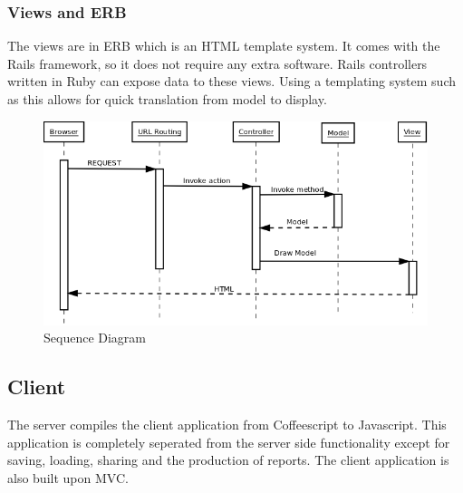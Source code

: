 \documentclass{report}
\begin{document}
				\subsubsection{Views and ERB} 
					The views are in ERB \cite{erb} which is an HTML template system. It comes with the Rails framework, so it does not require any extra software. Rails controllers written in Ruby can expose data to these views. Using a templating system such as this allows for quick translation from model to display. 
			\clearpage
			\begin{figure}[htb]
				\begin{center}
				\includegraphics[width=\linewidth]{SequenceDiagramLife.png}
				\caption{Sequence Diagram}
				\label{fig: SequenceDiagram}
				\end{center}
				\end{figure}	
			\clearpage

			\subsection{Client}
				The server compiles the client application from Coffeescript to Javascript. This application is completely seperated from the server side functionality except for saving, loading, sharing and the production of reports. The client application is also built upon MVC.\\	
				
\end{document}
